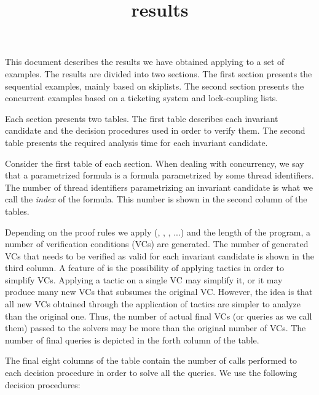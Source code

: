\documentclass[10pt]{article}
\begin{document}
\title{\Leap results}


\maketitle


This document describes the results we have obtained applying \Leap to a set of 
examples. The results are divided into two sections. The first section presents 
the sequential examples, mainly based on skiplists. The second section presents 
the concurrent examples based on a ticketing system and lock-coupling lists.

Each section presents two tables. The first table describes each invariant 
candidate and the decision procedures used in order to verify them. The second 
table presents the required analysis time for each invariant candidate.

Consider the first table of each section. When dealing with concurrency, we say 
that a parametrized formula is a formula parametrized by some thread 
identifiers. The number of thread identifiers parametrizing an invariant 
candidate is what we call the \emph{index} of the formula. This number is shown 
in the second column of the tables.

Depending on the proof rules we apply (\binv, \pinv, \spinv, ...) and the length 
of the program, a number of verification conditions (VCs) are generated.  The 
number of generated VCs that needs to be verified as valid for each invariant 
candidate is shown in the third column. A feature of \Leap is the possibility of 
applying tactics in order to simplify VCs. Applying a tactic on a single VC may 
simplify it, or it may produce many new VCs that subsumes the original VC.  
However, the idea is that all new VCs obtained through the application of 
tactics are simpler to analyze than the original one. Thus, the number of actual 
final VCs (or queries as we call them) passed to the solvers may be more than 
the original number of VCs. The number of final queries is depicted in the forth 
column of the table.

The final eight columns of the table contain the number of calls performed to 
each decision procedure in order to solve all the queries. We use the following 
decision procedures:
\end{document}

